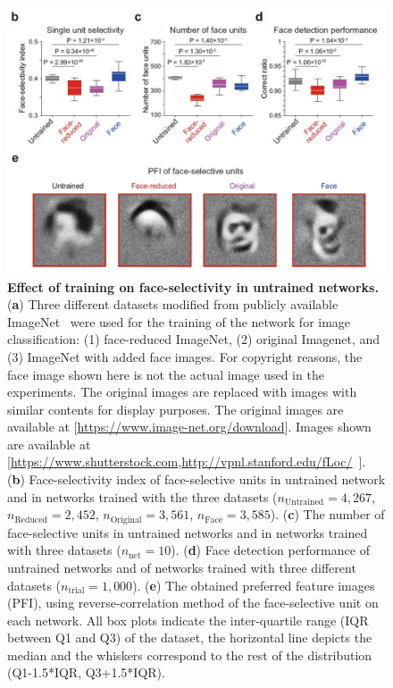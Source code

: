 \documentclass[sn-mathphys]{sn-jnl}%
\theoremstyle{thmstyleone}%
\theoremstyle{thmstyletwo}%
\theoremstyle{thmstylethree}%
\begin{document}
\begin{figure}[htbp]
	\centering
	
	\subfigure%
	{
		\begin{minipage}[t]{1.0\linewidth}
			\centering
			\includegraphics[width=1.0\textwidth]{figs/fig_4_b_f.pdf}
		\end{minipage}%
	}%
	
	
	\centering
	\caption{
		\textbf{Effect of training on face-selectivity in untrained networks.
		}
		(\textbf{a}) Three different datasets modified from publicly available ImageNet~\cite{ILSVRC15} were used for the training of the network for image classification: 
		(1) face-reduced ImageNet, 
		(2) original Imagenet, 
		and (3) ImageNet with added face images.
		For copyright reasons, the face image shown here is not the actual image used in the experiments.
		The original images are replaced with images with similar contents for display purposes.
		The original images are available at [\url{https://www.image-net.org/download}].
		Images shown are available at [\url{https://www.shutterstock.com},\url{http://vpnl.stanford.edu/fLoc/}~\cite{stigliani2015temporal}].
		(\textbf{b}) Face-selectivity index of face-selective units in untrained network and in networks trained with the three datasets ($ n_\textrm{Untrained} = 4,267 $, $ n_\textrm{Reduced} = 2,452 $, $ n_\textrm{Original} = 3,561 $, $ n_\textrm{Face} = 3,585 $).
		(\textbf{c}) The number of face-selective units in untrained networks and in networks trained with three datasets ($ n_\text{net} = 10 $).
		(\textbf{d}) Face detection performance of untrained networks and of networks trained with three different datasets ($ n_\textrm{trial} = 1,000 $).
		(\textbf{e}) The obtained preferred feature images (PFI), using reverse-correlation method of the face-selective unit on each network.
		All box plots indicate the inter-quartile range (IQR between Q1 and Q3) of the dataset,
		the horizontal line depicts the median and the whiskers correspond to the rest of the distribution (Q1-1.5*IQR, Q3+1.5*IQR).
	}
	\label{fig:effect}
\end{figure}
\end{document}
